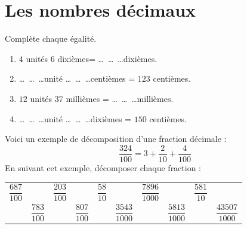 \documentclass[a4paper,10pt]{report}
\begin{document}

\newpage
\section*{Les nombres décimaux}

\begin{ex}
Complète chaque égalité.

\begin{enumerate}\medskip
\item $4$ unités $6$ dixièmes= \dots ~\dots ~\dots dixièmes.\medskip
\item  \dots ~\dots ~\dots unité \dots ~\dots ~\dots centièmes = $123$ centièmes.\medskip
\item  $12$ unités $37$ millièmes = \dots ~\dots ~\dots millièmes.\medskip
\item  \dots ~\dots ~\dots unité \dots ~\dots ~\dots dixièmes = $150$ centièmes.
\end{enumerate}
\end{ex}

\begin{ex}
Voici un exemple de décomposition d'une fraction décimale :
$$\dfrac{324}{100} = 3 + \dfrac{2}{10}+\dfrac{4}{100}$$
En suivant cet exemple, décomposer chaque fraction :
\begin{enumerate}
\begin{tabular}{m{1.2cm}m{1.2cm}m{1.2cm}m{1.2cm}m{1.2cm}m{1.2cm}m{1.2cm}m{1.2cm}m{1.2cm}m{1.25cm}}
\item $\dfrac{687}{100}$&&
\item $\dfrac{203}{100}$&&
\item $\dfrac{58}{10}$&&
\item $\dfrac{7896}{1000}$&&
\item $\dfrac{581}{10}$&\\&
\item $\dfrac{783}{100}$&&
\item $\dfrac{807}{100}$&&
\item $\dfrac{3543}{1000}$&&
\item $\dfrac{5813}{1000}$&&
\item $\dfrac{43507}{1000}$\\
\end{tabular}
\end{enumerate}
\end{ex}
\end{document}
